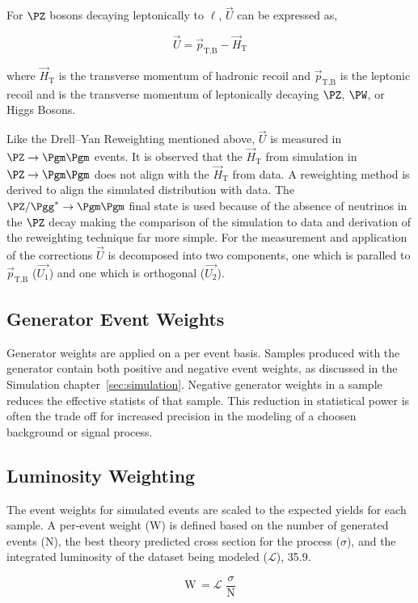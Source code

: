 For $\PZ$ bosons decaying leptonically to $\ell$, $\vec{U}$ can be expressed as,

\begin{equation}
\vec{U} = \vec{p}_{\text{T,B}} - \vec{H}_{\text{T}}
\end{equation}

where $\vec{H}_{\text{T}}$ is the transverse momentum of hadronic recoil and $\vec{p}_{\text{T,B}}$
is the leptonic recoil and is the transverse momentum of leptonically decaying $\PZ$, $\PW$, or Higgs Bosons.

Like the Drell--Yan Reweighting mentioned above, $\vec{U}$ is measured in $\PZ\to\Pgm\Pgm$ events.
It is observed that the $\vec{H}_{\text{T}}$ from simulation in $\PZ\to\Pgm\Pgm$ does not align with
the $\vec{H}_{\text{T}}$ from data. A reweighting method is derived to align the simulated distribution with 
data. The $\PZ/\Pgg^*\to\Pgm\Pgm$
final state is used because of the absence of neutrinos in the $\PZ$ decay making the comparison of
the simulation to data and derivation of the reweighting technique far more simple. For the measurement
and application of the corrections $\vec{U}$ is decomposed into two components, one which is
paralled to $\vec{p}_{\text{T,B}}$ ($\vec{U_{1}}$) and one which is orthogonal ($\vec{U_{2}}$).


\subsection{Generator Event Weights}
Generator weights are applied on a per event basis. Samples produced with the \aMCATNLO generator
contain both positive and negative event weights, as discussed in the Simulation chapter~\ref{sec:simulation}.
Negative generator weights in a sample reduces the effective statists of that sample. This reduction
in statistical power is often the trade off for increased precision in the modeling of a choosen
background or signal process.


\subsection{Luminosity Weighting}
The event weights for simulated events are scaled to the expected yields for each sample. A per-event
weight (W) is defined based on the number of generated events (N), the best theory predicted cross section
for the process ($\sigma$), and the integrated luminosity of the dataset being modeled 
($\mathcal{L}$), 35.9\fbinv.

\begin{equation}
\text{W} \, = \mathcal{L} \, \,  \frac{\sigma}{\text{N}}
\end{equation}

